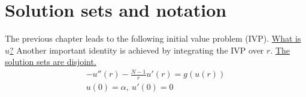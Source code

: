 \section{Solution sets and notation}\label{not}
The previous chapter leads to the following initial value problem (IVP). \underline{What is $u$?} Another important identity is achieved by integrating the IVP over $r$. \underline{The solution sets are disjoint.}
\begin{gather*}-u''(r)-\frac{N-1}{r}u'(r)=g(u(r))\tag{IVP}\label{ivp}\\ u(0)=\alpha,~u'(0)=0\end{gather*}
\begin{equation}\label{ivpint}
\end{equation}